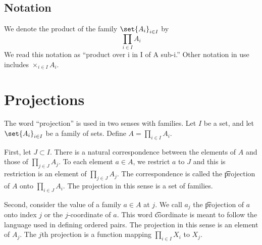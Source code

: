 \subsection*{Notation}

We denote the product of the family $\set{A_i}_{i \in I}$ by
\[
\textstyle
\prod_{i \in I} A_i
\]
We read this notation as ``product over i in I of A sub-i.''
Other notation in use includes $\times _{i \in I} A_i$.


\section*{Projections}

The word ``projection'' is used in two senses with families.
Let $I$ be a set, and let $\set{A_i}_{i \in I}$ be a family of sets.
Define $A = \prod_{i \in I} A_i$.

First, let $J \subset I$.
There is a natural correspondence between the elements of $A$ and those of $\prod_{j \in J} A_j$.
To each element $a \in A$, we restrict $a$ to $J$ and this is restriction is an element of $\prod_{j \in J} A_j$.
The correspondence is called the \t{projection} of $A$ onto $\prod_{i \in J} A_i$.
The projection in this sense is a set of families.

Second, consider the value of a family $a \in A$ at $j$.
We call $a_j$ the \t{projection of $a$ onto index $j$} or the \t{$j$-coordinate} of $a$.
This word \t{coordinate} is meant to follow the language used in defining ordered pairs.
The projection in this sense is an element of $A_j$.
The $j$th projection is a function mapping $\prod_{i \in I} X_i$ to $X_j$.

